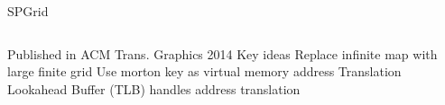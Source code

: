 \begin{frame}{SPGrid}
\begin{columns}
\centering
\begin{outline}
    \1 Published in ACM Trans. Graphics 2014 \cite{Setaluri2014}
    \1 Key ideas
      \2 Replace infinite map with large finite grid
      \2 Use morton key as virtual memory address
      \2 Translation Lookahead Buffer (TLB) handles address translation
\end{outline}
\centering
{} \\ \\

\end{columns}

\end{frame}
